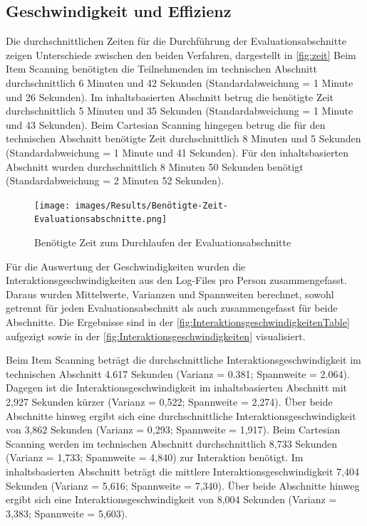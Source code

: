 \subsection{Geschwindigkeit und Effizienz}

Die durchschnittlichen Zeiten für die Durchführung der Evaluationsabschnitte zeigen Unterschiede zwischen den beiden Verfahren, dargestellt in \autoref{fig:zeit} Beim Item Scanning benötigten die Teilnehmenden im technischen Abschnitt durchschnittlich 6 Minuten und 42 Sekunden (Standardabweichung = 1 Minute und 26 Sekunden). Im inhaltsbasierten Abschnitt betrug die benötigte Zeit durchschnittlich 5 Minuten und 35 Sekunden (Standardabweichung = 1 Minute und 43 Sekunden).
Beim Cartesian Scanning hingegen betrug die für den technischen Abschnitt benötigte Zeit durchschnittlich 8 Minuten und 5 Sekunden (Standardabweichung = 1 Minute und 41 Sekunden). Für den inhaltsbasierten Abschnitt wurden durchschnittlich 8 Minuten 50 Sekunden benötigt (Standardabweichung = 2 Minuten 52 Sekunden).

\begin{figure}[tbh]
    \centering
    \texttt{[image: images/Results/Benötigte-Zeit-Evaluationsabschnitte.png]}
    \caption{Benötigte Zeit zum Durchlaufen der Evaluationsabschnitte}
    \label{fig:zeit}
\end{figure}

Für die Auswertung der Geschwindigkeiten wurden die Interaktionsgeschwindigkeiten aus den Log-Files pro Person zusammengefasst. Daraus wurden Mittelwerte, Varianzen und Spannweiten berechnet, sowohl getrennt für jeden Evaluationsabschnitt als auch zusammengefasst für beide Abschnitte. Die Ergebnisse sind in der \autoref{fig:InteraktionsgeschwindigkeitenTable} aufgezigt sowie in der \autoref{fig:Interaktionsgeschwindigkeiten} visualisiert. 

Beim Item Scanning beträgt die durchschnittliche Interaktionsgeschwindigkeit im technischen Abschnitt 4.617 Sekunden (Varianz = 0.381; Spannweite = 2.064). Dagegen ist die Interaktionsgeschwindigkeit im inhaltsbasierten Abschnitt mit 2,927 Sekunden kürzer (Varianz = 0,522; Spannweite = 2,274). Über beide Abschnitte hinweg ergibt sich eine durchschnittliche Interaktionsgeschwindigkeit von 3,862 Sekunden (Varianz = 0,293; Spannweite = 1,917).
Beim Cartesian Scanning werden im technischen Abschnitt durchschnittlich 8,733 Sekunden (Varianz = 1,733; Spannweite = 4,840) zur Interaktion benötigt. Im inhaltsbasierten Abschnitt beträgt die mittlere Interaktionsgeschwindigkeit 7,404 Sekunden (Varianz = 5,616; Spannweite = 7,340). Über beide Abschnitte hinweg ergibt sich eine Interaktionsgeschwindigkeit von 8,004 Sekunden (Varianz = 3,383; Spannweite = 5,603).

